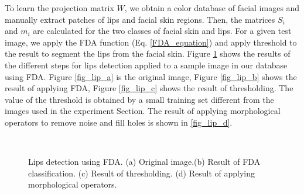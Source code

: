 To learn the projection matrix $W$, we obtain a color database of
facial images and manually extract patches of lips and facial skin
regions. Then, the matrices $S_i$ and $m_i$ are calculated for the
two classes of facial skin and lips. For a given test image, we
apply the FDA function (Eq. \ref{FDA_equation}) and apply threshold
to the result to segment the lips from the facial skin. Figure
\ref{fig:lip_detection} shows the results of the different steps for
lips detection applied to a sample image in our database using FDA.
Figure \ref{fig_lip_a} is the original image, Figure \ref{fig_lip_b}
shows the result of applying FDA, Figure \ref{fig_lip_c} shows the
result of thresholding. The value of the threshold is obtained by a
small training set different from the images used in the experiment
Section. The result of applying morphological operators to remove
noise and fill holes is shown in \ref{fig_lip_d}.
\begin{figure}[tbp]
  \begin{center}
    \mbox{
      }
      \mbox{
      }
\caption{Lips detection using FDA. (a) Original image.(b) Result of
FDA classification. (c) Result of thresholding. (d) Result of
applying morphological operators.}\label{fig:lip_detection}
\end{center}
\end{figure}
